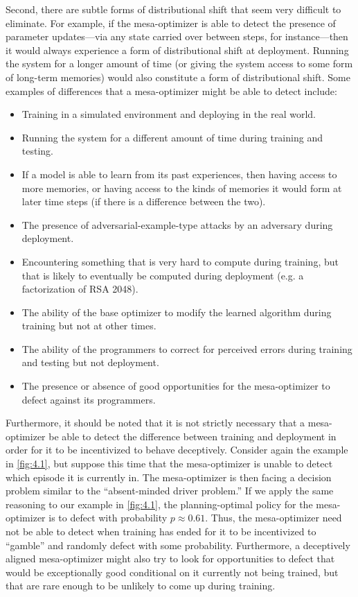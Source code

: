 \documentclass[
  onecolumn,
  natbib,
]{miri-tech-article}
\begin{document}
Second, there are subtle forms of distributional shift that seem very difficult to eliminate. For example, if the mesa-optimizer is able to detect the presence of parameter updates---via any state carried over between steps, for instance---then it would always experience a form of distributional shift at deployment. Running the system for a longer amount of time (or giving the system access to some form of long-term memories) would also constitute a form of distributional shift. Some examples of differences that a mesa-optimizer might be able to detect include:
\begin{itemize}
\item Training in a simulated environment and deploying in the real world.
\item Running the system for a different amount of time during training and testing.
\item If a model is able to learn from its past experiences, then having access to more memories, or having access to the kinds of memories it would form at later time steps (if there is a difference between the two).
\item The presence of adversarial-example-type attacks by an adversary during deployment.
\item Encountering something that is very hard to compute during training, but that is likely to eventually be computed during deployment (e.g. a factorization of RSA 2048\cite{paul_robust_corrigibility}).
\item The ability of the base optimizer to modify the learned algorithm during training but not at other times.
\item The ability of the programmers to correct for perceived errors during training and testing but not deployment.
\item The presence or absence of good opportunities for the mesa-optimizer to defect against its programmers.
\end{itemize}
Furthermore, it should be noted that it is not strictly necessary that a mesa-optimizer be able to detect the difference between training and deployment in order for it to be incentivized to behave deceptively. Consider again the example in \cref{fig:4.1}, but suppose this time that the mesa-optimizer is unable to detect which episode it is currently in. The mesa-optimizer is then facing a decision problem similar to the ``absent-minded driver problem.''\cite{absent_minded_driver} If we apply the same reasoning to our example in \cref{fig:4.1}, the planning-optimal policy for the mesa-optimizer is to defect with probability $p \approx 0.61$. Thus, the mesa-optimizer need not be able to detect when training has ended for it to be incentivized to ``gamble'' and randomly defect with some probability. Furthermore, a deceptively aligned mesa-optimizer might also try to look for opportunities to defect that would be exceptionally good conditional on it currently not being trained, but that are rare enough to be unlikely to come up during training.
\end{document}
